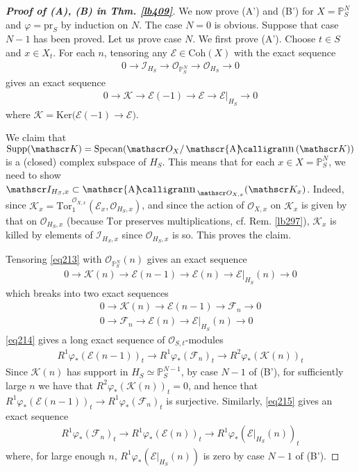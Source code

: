\documentclass[12pt,b5paper,notitlepage]{report}
\theoremstyle{definition}
\theoremstyle{plain}
\DeclareMathOperator{\sann}{\mathscr{A}\text{\kern -3pt {\calligra\large nn}}\,}
\newcommand{\scr}{\mathscr}
\newcommand{\Pbb}{\mathbb P}
\newcommand{\Ker}{\mathrm{Ker}}
\newcommand{\pr}{\mathrm {pr}}
\newcommand{\Supp}{\mathrm{Supp}}
\newcommand{\Specan}{\mathrm{Specan}}
\newcommand{\Tor}{\mathrm{Tor}}
\newcommand{\Coh}{\mathrm{Coh}}
\numberwithin{equation}{section}
\begin{document}
\begin{proof}[\textbf{Proof of (A), (B) in Thm. \ref{lb409}}]
We now prove (A') and (B') for $X=\Pbb^N_S$ and $\varphi=\pr_S$ by induction on $N$. The case $N=0$ is obvious. Suppose that case $N-1$ has been proved. Let us prove case $N$. We first prove (A'). Choose $t\in S$ and $x\in X_t$. For each $n$, tensoring any $\scr E\in\Coh(X)$ with the exact sequence
\begin{align*}
0\rightarrow\scr I_{H_S}\rightarrow\scr O_{\Pbb^N_S}\rightarrow\scr O_{H_S}\rightarrow0
\end{align*}
gives an exact sequence
\begin{align}\label{eq213}
0\rightarrow\scr K\rightarrow\scr E(-1)\rightarrow\scr E\rightarrow \scr E|_{H_S}\rightarrow0
\end{align}
where $\scr K=\Ker\big(\scr E(-1)\rightarrow\scr E\big)$. 


We claim that $\Supp(\scr K)=\Specan(\scr O_X/\sann(\scr K))$ is a (closed) complex subspace of $H_S$. This means that for each $x\in X=\Pbb^N_S$, we need to show $\scr I_{H_S,x}\subset\sann_{\scr O_{X,x}}(\scr K_x)$. Indeed, since $\scr K_x=\Tor_1^{\scr O_{X,x}}(\scr E_x,\scr O_{H_S,x})$, and since the action of $\scr O_{X,x}$ on $\scr K_x$ is given by that on $\scr O_{H_S,x}$ (because $\Tor$ preserves multiplications, cf. Rem. \ref{lb297}), $\scr K_x$ is killed by elements of $\scr I_{H_S,x}$ since $\scr O_{H_S,x}$ is so. This proves the claim.



Tensoring \eqref{eq213} with $\scr O_{\Pbb^N_S}(n)$ gives an exact sequence
\begin{align}
0\rightarrow\scr K(n)\rightarrow\scr E(n-1)\rightarrow\scr E(n)\rightarrow \scr E|_{H_S}(n)\rightarrow0 \label{eq222}
\end{align}
which breaks into two exact sequences
\begin{subequations}
\begin{gather}
0\rightarrow\scr K(n)\rightarrow\scr E(n-1)\rightarrow\scr F_n\rightarrow0\label{eq214}\\
0\rightarrow\scr F_n\rightarrow\scr E(n)\rightarrow \scr E|_{H_S}(n)\rightarrow0 \label{eq215}
\end{gather}
\end{subequations}
\eqref{eq214} gives a long exact sequence of $\scr O_{S,t}$-modules
\begin{align*}
R^1\varphi_*(\scr E(n-1))_t\rightarrow R^1\varphi_*(\scr F_n)_t\rightarrow R^2\varphi_*(\scr K(n))_t
\end{align*}
Since $\scr K(n)$ has support in $H_S\simeq\Pbb^{N-1}_S$, by case $N-1$ of (B'), for sufficiently large $n$ we have that $R^2\varphi_*(\scr K(n))_t=0$, and hence that $R^1\varphi_*(\scr E(n-1))_t\rightarrow R^1\varphi_*(\scr F_n)_t$ is surjective. Similarly, \eqref{eq215} gives an exact sequence
\begin{align}
R^1\varphi_*(\scr F_n)_t\rightarrow R^1\varphi_*(\scr E(n))_t\rightarrow R^1\varphi_*(\scr E|_{H_S}(n))_t  \label{eq216}
\end{align}
where, for large enough $n$, $R^1\varphi_*(\scr E|_{H_S}(n))$ is zero by case $N-1$ of (B'). 


\end{proof}
\end{document}
